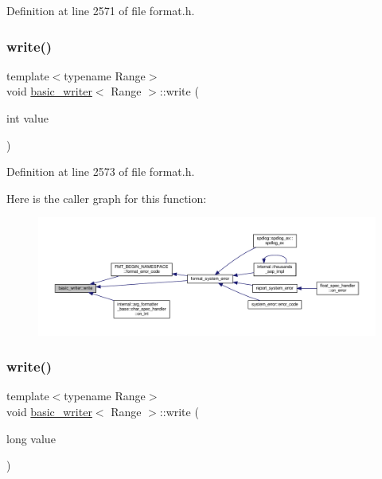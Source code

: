 Definition at line 2571 of file format.\+h.

\mbox{\label{classbasic__writer_a1d44923710a19cdeb09ca5e834641ea8}} 
\subsubsection{\texorpdfstring{write()}{write()}\hspace{0.1cm}{\footnotesize\ttfamily [1/16]}}
{\footnotesize\ttfamily template$<$typename Range$>$ \\
void \hyperlink{classbasic__writer}{basic\+\_\+writer}$<$ Range $>$\+::write (\begin{DoxyParamCaption}\item[{int}]{value }\end{DoxyParamCaption})\hspace{0.3cm}{\ttfamily [inline]}}



Definition at line 2573 of file format.\+h.

Here is the caller graph for this function\+:
\nopagebreak
\begin{figure}[H]
\begin{center}
\leavevmode
\includegraphics[width=350pt]{classbasic__writer_a1d44923710a19cdeb09ca5e834641ea8_icgraph}
\end{center}
\end{figure}
\mbox{\label{classbasic__writer_a93f39d53e8c24f5de9522a02ca039f52}} 
\subsubsection{\texorpdfstring{write()}{write()}\hspace{0.1cm}{\footnotesize\ttfamily [2/16]}}
{\footnotesize\ttfamily template$<$typename Range$>$ \\
void \hyperlink{classbasic__writer}{basic\+\_\+writer}$<$ Range $>$\+::write (\begin{DoxyParamCaption}\item[{long}]{value }\end{DoxyParamCaption})\hspace{0.3cm}{\ttfamily [inline]}}



